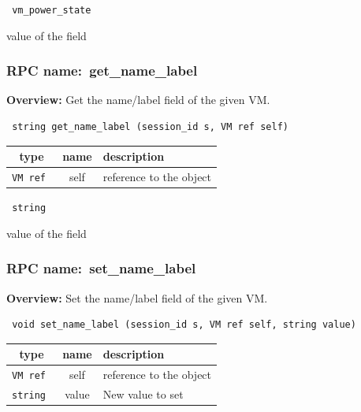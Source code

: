 {\tt 
vm\_power\_state
}


value of the field
\vspace{0.3cm}
\vspace{0.3cm}
\vspace{0.3cm}
\subsubsection{RPC name:~get\_name\_label}

{\bf Overview:} 
Get the name/label field of the given VM.

\begin{verbatim} string get_name_label (session_id s, VM ref self)\end{verbatim}



 
\vspace{0.3cm}
\begin{tabular}{|c|c|p{7cm}|}
 \hline
{\bf type} & {\bf name} & {\bf description} \\ \hline
{\tt VM ref } & self & reference to the object \\ \hline 

\end{tabular}

\vspace{0.3cm}

{\tt 
string
}


value of the field
\vspace{0.3cm}
\vspace{0.3cm}
\vspace{0.3cm}
\subsubsection{RPC name:~set\_name\_label}

{\bf Overview:} 
Set the name/label field of the given VM.

\begin{verbatim} void set_name_label (session_id s, VM ref self, string value)\end{verbatim}



 
\vspace{0.3cm}
\begin{tabular}{|c|c|p{7cm}|}
 \hline
{\bf type} & {\bf name} & {\bf description} \\ \hline
{\tt VM ref } & self & reference to the object \\ \hline 

{\tt string } & value & New value to set \\ \hline 

\end{tabular}

